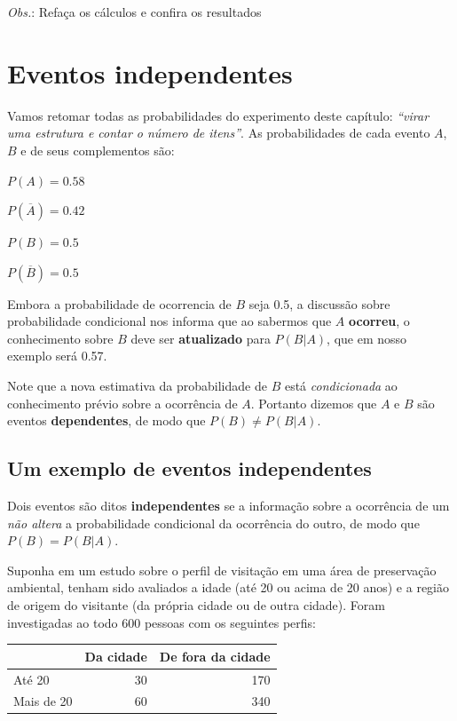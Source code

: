 \documentclass[
]{book}
\begin{document}
\emph{Obs.}: Refaça os cálculos e confira os resultados

\hypertarget{eventos-independentes}{%
\section{Eventos independentes}\label{eventos-independentes}}

Vamos retomar todas as probabilidades do experimento deste capítulo: \emph{``virar uma estrutura e contar o número de itens''}. As probabilidades de cada evento \(A\), \(B\) e de seus complementos são:

\(P(A) = 0.58\)

\(P(\overline{A}) = 0.42\)

\(P(B) = 0.5\)

\(P(\overline{B}) = 0.5\)

Embora a probabilidade de ocorrencia de \(B\) seja 0.5, a discussão sobre probabilidade condicional nos informa que ao sabermos que \(A\) \textbf{ocorreu}, o conhecimento sobre \(B\) deve ser \textbf{atualizado} para \(P(B|A)\), que em nosso exemplo será 0.57.

Note que a nova estimativa da probabilidade de \(B\) está \emph{condicionada} ao conhecimento prévio sobre a ocorrência de \(A\). Portanto dizemos que \(A\) e \(B\) são eventos \textbf{dependentes}, de modo que \(P(B) \neq P(B|A)\).

\hypertarget{um-exemplo-de-eventos-independentes}{%
\subsection{Um exemplo de eventos independentes}\label{um-exemplo-de-eventos-independentes}}

Dois eventos são ditos \textbf{independentes} se a informação sobre a ocorrência de um \emph{não altera} a probabilidade condicional da ocorrência do outro, de modo que \(P(B) = P(B|A)\).

Suponha em um estudo sobre o perfil de visitação em uma área de preservação ambiental, tenham sido avaliados a idade (até 20 ou acima de 20 anos) e a região de origem do visitante (da própria cidade ou de outra cidade). Foram investigadas ao todo 600 pessoas com os seguintes perfis:

\begin{tabular}{l|r|r}
\hline
  & Da cidade & De fora da cidade\\
\hline
Até 20 & 30 & 170\\
\hline
Mais de 20 & 60 & 340\\
\hline
\end{tabular}
\end{document}
